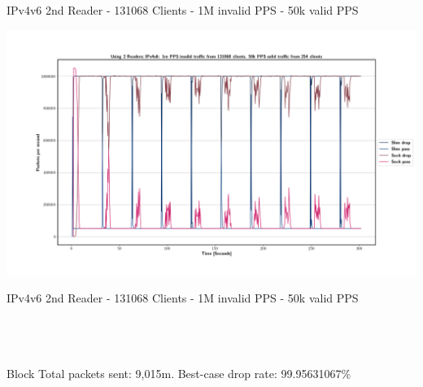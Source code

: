 \documentclass[11pt,english,table,dvipsnames]{beamer}
\begin{document}
\begin{frame}{IPv4v6 2nd Reader - 131068 Clients - 1M invalid PPS - 50k valid PPS}
    \begin{center}
        \includegraphics[width=1.\linewidth]{images/IPv4v6_1m_2ndReader_1.png}
    \end{center}
\end{frame}

\begin{frame}{IPv4v6 2nd Reader - 131068 Clients - 1M invalid PPS - 50k valid PPS}
    \phantom{Filler}\\
    \phantom{Filler}\\
    \phantom{Filler}\\
    \phantom{Filler}\\
    \begin{block}{Block}
        Total packets sent: 9,015m. Best-case drop rate: 99.95631067\%
    \end{block}
\end{frame}
\end{document}
